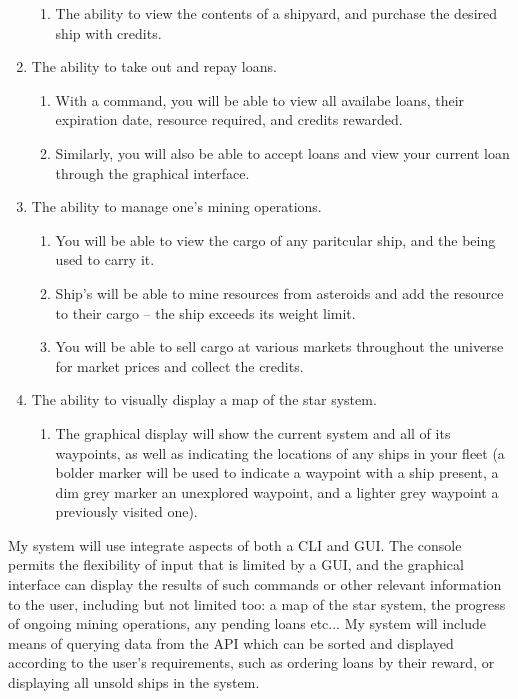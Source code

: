 \begin{enumerate}
\begin{enumerate}
            \item The ability to view the contents of a shipyard, and purchase the desired ship with credits. 
        \end{enumerate}
    \item The ability to take out and repay loans.
        \begin{enumerate}
            \item With a command, you will be able to view all availabe loans, their expiration date, resource required, and credits rewarded.
            \item Similarly, you will also be able to accept loans and view your current loan through the graphical interface.
        \end{enumerate}
    \item The ability to manage one's mining operations.
        \begin{enumerate}
            \item You will be able to view the cargo of any paritcular ship, and the being used to carry it. 
            \item Ship's will be able to mine resources from asteroids and add the resource to their cargo – the ship exceeds its weight limit.
            \item You will be able to sell cargo at various markets throughout the universe for market prices and collect the credits.
        \end{enumerate}
    \item The ability to visually display a map of the star system.
        \begin{enumerate}
            \item The graphical display will show the current system and all of its waypoints, as well as indicating the locations of any ships in your fleet (a bolder marker will be used to indicate a waypoint with a ship present, a dim grey marker an unexplored waypoint, and a lighter grey waypoint a previously visited one).
        \end{enumerate}
\end{enumerate}

My system will use integrate aspects of both a CLI and GUI. The console permits the flexibility of input that is limited by a GUI, and the graphical interface can display the results of such commands or other relevant information to the user, including but not limited too: a map of the star system, the progress of ongoing mining operations, any pending loans etc... My system will include means of querying data from the API which can be sorted and displayed according to the user's requirements, such as ordering loans by their reward, or displaying all unsold ships in the system. 

